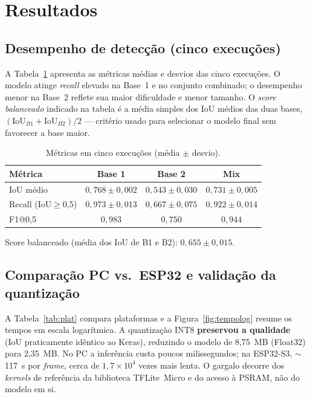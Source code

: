 \documentclass[conference]{IEEEtran}
\begin{document}
\section{Resultados}\label{sec:res}
\subsection{Desempenho de detecção (cinco execuções)}
A Tabela~\ref{tab:cinco} apresenta as métricas médias e desvios das cinco execuções.
O modelo atinge \emph{recall} elevado na Base~1 e no conjunto combinado; o
desempenho menor na Base~2 reflete sua maior dificuldade e menor tamanho. O
\emph{score balanceado} indicado na tabela é a média simples dos IoU médios das
duas bases, $(\text{IoU}_{B1}+\text{IoU}_{B2})/2$ --- critério usado para
selecionar o modelo final sem favorecer a base maior.

\begin{table}[!t]
\centering
\caption{Métricas em cinco execuções (média $\pm$ desvio).}
\label{tab:cinco}
\begin{tabular}{lccc}
\toprule
Métrica & Base 1 & Base 2 & Mix\\
\midrule
IoU médio          & $0{,}768\pm0{,}002$ & $0{,}543\pm0{,}030$ & $0{,}731\pm0{,}005$\\
Recall (IoU$\ge$0,5) & $0{,}973\pm0{,}013$ & $0{,}667\pm0{,}075$ & $0{,}922\pm0{,}014$\\
F1@0,5             & $0{,}983$ & $0{,}750$ & $0{,}944$\\
\bottomrule
\end{tabular}
\par\smallskip
\footnotesize Score balanceado (média dos IoU de B1 e B2): $0{,}655\pm0{,}015$.
\end{table}

\subsection{Comparação PC vs.\ ESP32 e validação da quantização}
A Tabela~\ref{tab:plat} compara plataformas e a Figura~\ref{fig:tempolog}
resume os tempos em escala logarítmica. A quantização INT8 \textbf{preservou a
qualidade} (IoU praticamente idêntico ao Keras), reduzindo o modelo de 8{,}75~MB
(Float32) para 2{,}35~MB. No PC a inferência custa poucos milissegundos; na
ESP32-S3, $\sim$117~s por \emph{frame}, cerca de $1{,}7\times10^{4}$ vezes mais
lenta. O gargalo decorre dos \emph{kernels} de referência da biblioteca
TFLite~Micro e do acesso à PSRAM, não do modelo em si.
\end{document}
